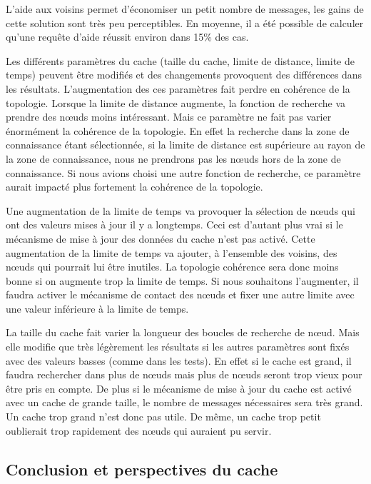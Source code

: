 \par L'aide aux voisins permet d'économiser un petit nombre de messages, les gains de cette solution sont très peu perceptibles. En moyenne, il a été possible de calculer qu'une requête d'aide réussit environ dans 15\% des cas.

\par Les différents paramètres du cache (taille du cache, limite de distance, limite de temps) peuvent être modifiés et des changements provoquent des différences dans les résultats. L'augmentation des ces paramètres fait perdre en cohérence de la topologie. Lorsque la limite de distance augmente, la fonction de recherche va prendre des nœuds moins intéressant. Mais ce paramètre ne fait pas varier énormément la cohérence de la topologie. En effet la recherche dans la zone de connaissance étant sélectionnée, si la limite de distance est supérieure au rayon de la zone de connaissance, nous ne prendrons pas les nœuds hors de la zone de connaissance. Si nous avions choisi une autre fonction de recherche, ce paramètre aurait impacté plus fortement la cohérence de la topologie.
\par Une augmentation de la limite de temps va provoquer la sélection de nœuds qui ont des valeurs mises à jour il y a longtemps. Ceci est d'autant plus vrai si le mécanisme de mise à jour des données du cache n'est pas activé. Cette augmentation de la limite de temps va ajouter, à l'ensemble des voisins, des nœuds qui pourrait lui être inutiles. La topologie cohérence sera donc moins bonne si on augmente trop la limite de temps. Si nous souhaitons l'augmenter, il faudra activer le mécanisme de contact des nœuds et fixer une autre limite avec une valeur inférieure à la limite de temps.
\par La taille du cache fait varier la longueur des boucles de recherche de nœud. Mais elle modifie que très légèrement les résultats si les autres paramètres sont fixés avec des valeurs basses (comme dans les tests). En effet si le cache est grand, il faudra rechercher dans plus de nœuds mais plus de nœuds seront trop vieux pour être pris en compte. De plus si le mécanisme de mise à jour du cache est activé avec un cache de grande taille, le nombre de messages nécessaires sera très grand. Un cache trop grand n'est donc pas utile. De même, un cache trop petit oublierait trop rapidement des nœuds qui auraient pu servir.  

\subsection{Conclusion et perspectives du cache} 

